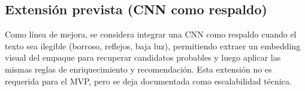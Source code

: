 \subsection{Extensión prevista (CNN como respaldo)}
Como línea de mejora, se considera integrar una CNN como respaldo cuando el texto sea ilegible (borroso, reflejos, baja luz), permitiendo extraer un embedding visual del empaque para recuperar candidatos probables y luego aplicar las mismas reglas de enriquecimiento y recomendación. Esta extensión no es requerida para el MVP, pero se deja documentada como escalabilidad técnica.

\pagebreak